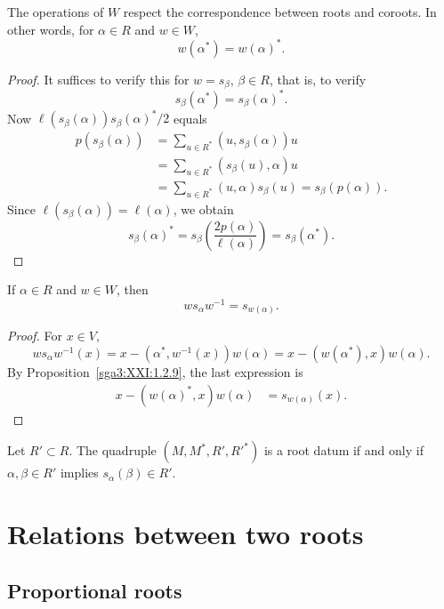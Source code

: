 \begin{proposition}\label{sga3:XXI:1.2.9}
The operations of \(W\) respect the correspondence between roots and
coroots. In other words, for \(\alpha\in R\) and \(w\in W\),
\[
 w(\alpha^\ast)=w(\alpha)^\ast.
\]
\end{proposition}

\begin{proof}
It suffices to verify this for \(w=s_\beta\), \(\beta\in R\), that is,
to verify
\[
 s_\beta(\alpha^\ast)=s_\beta(\alpha)^\ast.
\]
Now \(\ell(s_\beta(\alpha))s_\beta(\alpha)^\ast/2\) equals
\begin{align*}
 p(s_\beta(\alpha))
 &=\sum_{u\in R^\ast}(u,s_\beta(\alpha))u\\
 &=\sum_{u\in R^\ast}(s_\beta(u),\alpha)u\\
 &=\sum_{u\in R^\ast}(u,\alpha)s_\beta(u)
  =s_\beta(p(\alpha)).
\end{align*}
Since \(\ell(s_\beta(\alpha))=\ell(\alpha)\), we obtain
\[
 s_\beta(\alpha)^\ast
 =s_\beta\!\left(\frac{2p(\alpha)}{\ell(\alpha)}\right)
 =s_\beta(\alpha^\ast).
\]
\end{proof}

\begin{corollary}\label{sga3:XXI:1.2.10}
If \(\alpha\in R\) and \(w\in W\), then
\[
 ws_\alpha w^{-1}=s_{w(\alpha)}.
\]
\end{corollary}

\begin{proof}
For \(x\in V\),
\[
 ws_\alpha w^{-1}(x)
 =x-(\alpha^\ast,w^{-1}(x))w(\alpha)
 =x-(w(\alpha^\ast),x)w(\alpha).
\]
By Proposition~\ref{sga3:XXI:1.2.9}, the last expression is
\[
 \begin{aligned}
 x-(w(\alpha)^\ast,x)w(\alpha)
   &=s_{w(\alpha)}(x).
 \end{aligned}
\]
\end{proof}

\begin{corollary}\label{sga3:XXI:1.2.11}\leavevmode\par
Let \(R'\subset R\). The quadruple
\((M,M^\ast,R',R'^\ast)\) is a root datum if and only if
\(\alpha,\beta\in R'\) implies \(s_\alpha(\beta)\in R'\).
\end{corollary}

\section{Relations between two roots}

\subsection{Proportional roots}

